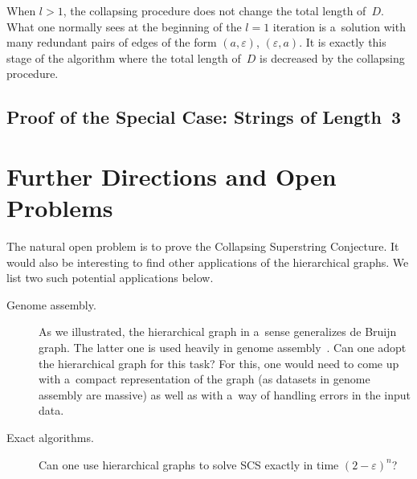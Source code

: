 \documentclass[11pt,letterpaper]{article}
\begin{document}
When $l>1$, the collapsing procedure does not change the total length of~$D$. 
What one normally sees at the beginning of the
$l=1$ iteration is a~solution with many 
redundant pairs of edges of the form $(a, \varepsilon)$, $(\varepsilon, a)$. It is exactly this stage of the algorithm where the total length of~$D$ is decreased by the collapsing procedure.

\subsection{Proof of the Special Case: Strings of Length~3}\label{subsec:scs3}
%


\section{Further Directions and Open Problems}
The natural open problem is to prove the Collapsing Superstring Conjecture.
It would also be interesting to find other applications of the 
hierarchical graphs. We list two such potential applications below.
\begin{description}
\item[Genome assembly.] As we illustrated, the hierarchical graph in a~sense
generalizes de Bruijn graph. The latter one is used heavily 
in genome assembly~\cite{}.
Can one adopt the hierarchical graph for this task? For this, one
would need to come up with a~compact representation of the graph
(as datasets in genome assembly are massive) as well as with a~way of
handling errors in the input data.

\item[Exact algorithms.] Can one use hierarchical graphs to solve SCS exactly in time $(2-\varepsilon)^n$?
\end{description}



\end{document}
